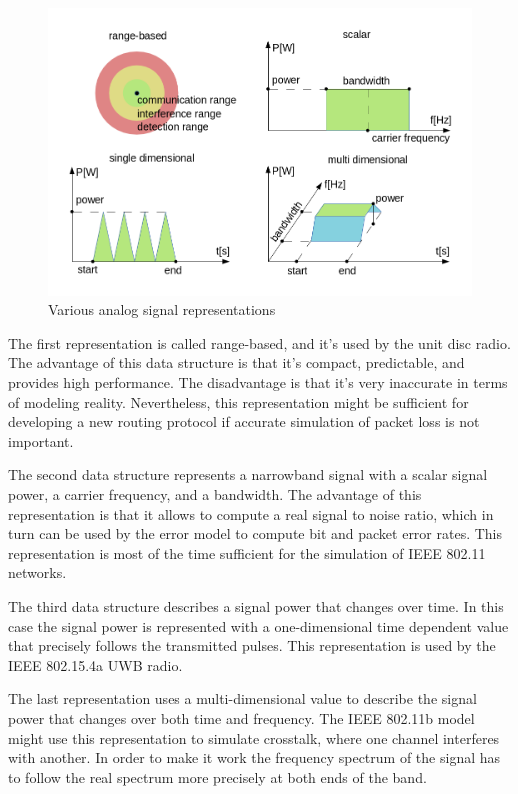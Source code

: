 \begin{figure}[h!]
\centering
\includegraphics[width=\textwidth]{figures/phyanalog}
\caption{Various analog signal representations}
\end{figure}

The first representation is called range-based, and it's used by the unit disc
radio. The advantage of this data structure is that it's compact, predictable,
and provides high performance. The disadvantage is that it's very inaccurate in
terms of modeling reality. Nevertheless, this representation might be sufficient
for developing a new routing protocol if accurate simulation of packet loss is
not important.

The second data structure represents a narrowband signal with a scalar signal
power, a carrier frequency, and a bandwidth. The advantage of this
representation is that it allows to compute a real signal to noise ratio, which
in turn can be used by the error model to compute bit and packet error rates.
This representation is most of the time sufficient for the simulation of IEEE
802.11 networks.

The third data structure describes a signal power that changes over time. In
this case the signal power is represented with a one-dimensional time dependent
value that precisely follows the transmitted pulses. This representation is used
by the IEEE 802.15.4a UWB radio.

The last representation uses a multi-dimensional value to describe the signal
power that changes over both time and frequency. The IEEE 802.11b model might
use this representation to simulate crosstalk, where one channel interferes with
another. In order to make it work the frequency spectrum of the signal has to
follow the real spectrum more precisely at both ends of the band.


